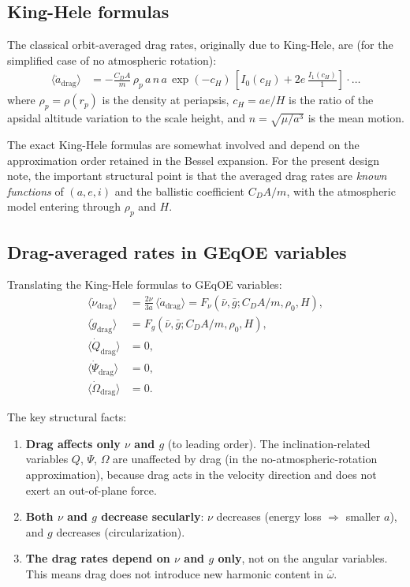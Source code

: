 \documentclass[11pt]{article}
\newcommand{\mean}[1]{\langle #1 \rangle}
\begin{document}
\subsection{King-Hele formulas}

The classical orbit-averaged drag rates, originally due to King-Hele, are
(for the simplified case of no atmospheric rotation):
\begin{align}
\mean{\dot a_{\mathrm{drag}}}
&= -\frac{C_D A}{m}\,\rho_p\,a\,n\,a\,
\exp(-c_H)\,
\left[
I_0(c_H) + 2e\,\frac{I_1(c_H)}{1}
\right]
\cdot \ldots
\label{eq:adot_KH}
\end{align}
where $\rho_p = \rho(r_p)$ is the density at periapsis,
$c_H = ae/H$ is the ratio of the apsidal altitude variation to the scale
height, and $n = \sqrt{\mu/a^3}$ is the mean motion.

The exact King-Hele formulas are somewhat involved and depend on the
approximation order retained in the Bessel expansion. For the present design
note, the important structural point is that the averaged drag rates are
\emph{known functions} of $(a, e, i)$ and the ballistic coefficient
$C_D A/m$, with the atmospheric model entering through $\rho_p$ and $H$.

\subsection{Drag-averaged rates in GEqOE variables}

Translating the King-Hele formulas to GEqOE variables:
\begin{align}
\mean{\dot\nu_{\mathrm{drag}}}
&= \frac{2\nu}{3a}\,\mean{\dot a_{\mathrm{drag}}}
= F_\nu(\bar\nu, \bar g; C_D A/m, \rho_0, H),
\label{eq:nudot_geqoe}\\
\mean{\dot g_{\mathrm{drag}}}
&= F_g(\bar\nu, \bar g; C_D A/m, \rho_0, H),
\label{eq:gdot_geqoe}\\
\mean{\dot Q_{\mathrm{drag}}} &= 0,
\label{eq:Qdot_drag}\\
\mean{\dot\Psi_{\mathrm{drag}}} &= 0,
\label{eq:Psidot_drag}\\
\mean{\dot\Omega_{\mathrm{drag}}} &= 0.
\label{eq:Omegadot_drag}
\end{align}

The key structural facts:
\begin{enumerate}
\item \textbf{Drag affects only $\nu$ and $g$} (to leading order). The
inclination-related variables $Q$, $\Psi$, $\Omega$ are unaffected by drag
(in the no-atmospheric-rotation approximation), because drag acts in the
velocity direction and does not exert an out-of-plane force.

\item \textbf{Both $\nu$ and $g$ decrease secularly}: $\nu$ decreases
(energy loss $\Rightarrow$ smaller $a$), and $g$ decreases (circularization).

\item \textbf{The drag rates depend on $\nu$ and $g$ only}, not on the
angular variables. This means drag does not introduce new harmonic content
in $\bar\omega$.
\end{enumerate}
\end{document}
